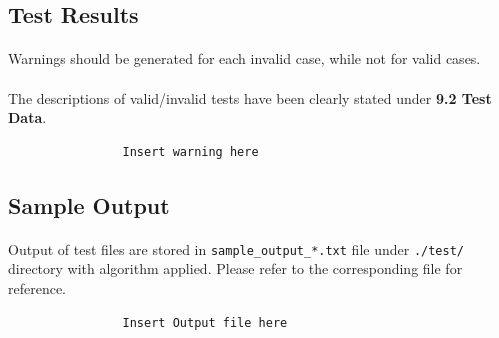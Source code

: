 \documentclass{article}
\begin{document}
        \subsection{Test Results}
            \paragraph{}
                Warnings should be generated for each invalid case, while not for valid cases. 
            \paragraph{}
                The descriptions of valid/invalid tests have been clearly stated under
                \textbf{9.2 Test Data}.
            \begin{verbatim}
                Insert warning here
            \end{verbatim}
        \subsection{Sample Output}
            \paragraph{}
                Output of test files are stored in \texttt{sample\_output\_*.txt} file under
                \texttt{./test/} directory with algorithm applied. Please refer to the
                corresponding file for reference.
            \begin{verbatim}
                Insert Output file here
            \end{verbatim}
\end{document}

